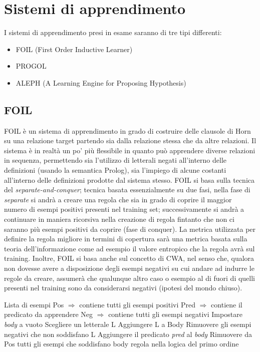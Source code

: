 \section{Sistemi di apprendimento}

I sistemi di apprendimento presi in esame saranno di tre tipi differenti:

\begin{itemize}
	\item FOIL (First Order Inductive Learner)
	\item PROGOL
	\item ALEPH (A Learning Engine for Proposing Hypothesis)
\end{itemize}

\subsection{FOIL}
\nocite{Quinlan:1993:FMR:645323.649599}
FOIL è un sistema di apprendimento in grado di costruire delle clausole di Horn su una relazione target partendo sia dalla relazione stessa che da altre relazioni. Il sistema è in realtà un po' più flessibile in quanto può apprendere diverse relazioni in sequenza, permettendo sia l'utilizzo di letterali negati all'interno delle definizioni (usando la semantica Prolog), sia l'impiego di alcune costanti all'interno delle definizioni prodotte dal sistema stesso.
FOIL si basa sulla tecnica del \textit{separate-and-conquer}; tecnica basata essenzialmente su due fasi, nella fase di \textit{separate} si andrà a creare una regola che sia in grado di coprire il maggior numero di esempi positivi presenti nel training set; successivamente si andrà a continuare in maniera ricorsiva nella creazione di regola fintanto che non ci saranno più esempi positivi da coprire (fase di conquer).
La metrica utilizzata per definire la regola migliore in termini di copertura sarà una metrica basata sulla teoria dell'informazione come ad esempio il valore entropico che la regola avrà sul training.
Inoltre, FOIL si basa anche sul concetto di CWA, nel senso che, qualora non dovesse avere a disposizione degli esempi negativi su cui andare ad indurre le regole da creare, assumerà che qualunque altro caso o esempio al di fuori di quelli presenti nel training sono da considerarsi negativi (ipotesi del mondo chiuso).
\begin{algorithm}
	\begin{algorithmic}[1]
		\REQUIRE Lista di esempi
		\STATE Pos $\Rightarrow$ contiene tutti gli esempi positivi
		\STATE Pred $\Rightarrow$ contiene il predicato da apprendere
		\STATE Neg $\Rightarrow$ contiene tutti gli esempi negativi
		\STATE Impostare \textit{body} a vuoto
		\STATE Scegliere un letterale L
		\STATE Aggiungere L a Body
		\STATE Rimuovere gli esempi negativi che non soddisfano L
		\ENDWHILE
		\STATE Aggiungere il predicato \textit{pred} al \textit{body}
		\STATE Rimuovere da Pos tutti gli esempi che soddisfano body
		\ENDWHILE
		\ENDFOR
		\RETURN regola nella logica del primo ordine
	\end{algorithmic}
\end{algorithm}

